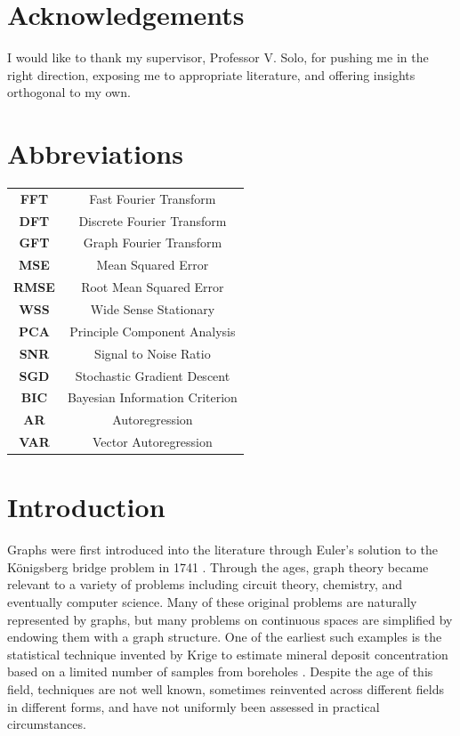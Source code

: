 \documentclass[12pt,a4paper]{article} %
\begin{document}
\newpage
{}
\setcounter{page}{1}
\section*{Acknowledgements}
I would like to thank my supervisor, Professor V. Solo, for pushing me in the right direction, exposing me to appropriate literature, and offering insights orthogonal to my own.

\newpage
\section*{Abbreviations}
\begin{tabular}{cc}
    \textbf{FFT} & Fast Fourier Transform \\
    \textbf{DFT} & Discrete Fourier Transform \\
    \textbf{GFT} & Graph Fourier Transform \\
    \textbf{MSE} & Mean Squared Error \\
    \textbf{RMSE} & Root Mean Squared Error \\
    \textbf{WSS} & Wide Sense Stationary \\
    \textbf{PCA} & Principle Component Analysis \\
    \textbf{SNR} & Signal to Noise Ratio \\
    \textbf{SGD} & Stochastic Gradient Descent \\
    \textbf{BIC} & Bayesian Information Criterion \\
    \textbf{AR}  & Autoregression \\
    \textbf{VAR} & Vector Autoregression
\end{tabular}
\newpage
\tableofcontents

\newpage
\section{Introduction}
Graphs were first introduced into the literature through Euler's solution to the K\"{o}nigsberg bridge problem in 1741 \cite{euler}. Through the ages, graph theory became relevant to a variety of problems including circuit theory, chemistry, and eventually computer science. Many of these original problems are naturally represented by graphs, but many problems on continuous spaces are simplified by endowing them with a graph structure. One of the earliest such examples is the statistical technique invented by Krige to estimate mineral deposit concentration based on a limited number of samples from boreholes \cite{krige}. Despite the age of this field, techniques are not well known, sometimes reinvented across different fields in different forms, and have not uniformly been assessed in practical circumstances.\\
\end{document}
